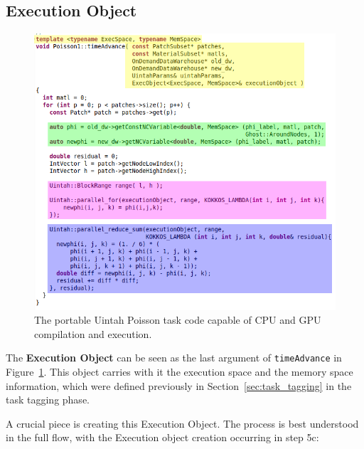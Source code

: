 \documentclass[]{article}
\begin{document}
\subsection{Execution Object}

\begin{figure}[h]
	\centerline{
		\includegraphics[width=1.0\textwidth,draft=false]{figures/poisson_task_code_after_colored.png}
	}
	\caption{ The portable Uintah Poisson task code capable of CPU and GPU compilation and execution.}
	\label{fig:poisson_task_code_after_colored}
\end{figure}

The \textbf{Execution Object} can be seen as the last argument of \texttt{timeAdvance} in Figure~\ref{fig:poisson_task_code_after_colored}.  This object carries with it the execution space and the memory space information, which were defined previously in Section~\ref{sec:task_tagging} in the task tagging phase.

A crucial piece is creating this Execution Object.  The process is best understood in the full flow, with the Execution object creation occurring in step 5c:
\end{document}
